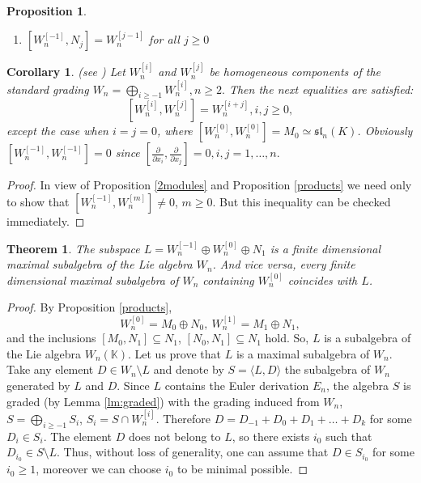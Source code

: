 \documentclass[12pt,a4paper]{amsart}
\theoremstyle{plain}
\newtheorem{theorem}{Theorem}
\newtheorem{proposition}{Proposition}
\newtheorem{corollary}{Corollary}
\theoremstyle{definition}
\begin{document}
{\begin{proposition}
\begin{enumerate}
			(b) $i= 0$, $j= 1,2,\dots$, where $[M_{0}, N_{j}] = N_{j}$,
			
			(c) $ i\geq 1 , j=0,  $ where $ [M_i, N_0]=M_i.$
			\item $[W_n^{[-1]}, N_{j}] = W_{n}^{[j-1]}$ for all $j\ge 0$
		\end{enumerate}
	\end{proposition}
	
	\begin{corollary}\label{W_iWj} (see \cite{CP25})
		Let  $W^{[i]}_n$ and $W^{[j]}_n$ be homogeneous components  of the standard grading $W_n= \underset{i\ge-1}{\bigoplus}W_{n}^{[i]}, n\geq 2.$ Then  the next equalities are satisfied: 
		$$[W^{[i]}_n, W^{[j]}_n]= W^{[i+j]}_n, i, j\geq 0,$$ except the case when  $i=j=0$, where $[W_{n}^{[0]}, W_{n}^{[0]}]=M_{0}\simeq \mathfrak{sl}_{n}(K)$. Obviously $[W_n^{[-1]}, W_n^{[-1]}]=0$ since $[\frac{\partial}{\partial x_i}, \frac{\partial}{\partial x_j}]=0, i,j=1,\ldots ,n. $
	\end{corollary}
	\begin{proof}
		In view of Proposition \ref{2modules} and Proposition \ref{products} we need only to show that 
		$[W_{n}^{[-1]}, W_{n}^{[m]}]\not = 0$, $m\ge 0$. But this inequality can be checked immediately. 
	\end{proof}
	\begin{theorem}\label{th5}
		The subspace $L = W_n^{[-1]} \oplus W_n^{[0]} \oplus N_1$  is a finite dimensional maximal subalgebra of the Lie algebra $W_n$. And vice versa, every finite dimensional maximal subalgebra of $W_n$ containing $W_n^{[0]}$ coincides with $L$.
	\end{theorem}
	\begin{proof}
		By Proposition  \ref{products}, 
		$$W_n^{[0]} = M_0 \oplus N_0,  \ W_n^{[1]} = M_1 \oplus N_1,$$ and the inclusions $[M_0, N_1] \subseteq N_1$, $[N_0, N_1] \subseteq N_1$ hold. So, $L$ is a subalgebra of the Lie algebra $W_n(\mathbb{K})$.
		Let us prove that $L$ is a maximal subalgebra of $W_n$. Take any element $D \in W_n \setminus L$ and denote by $S = \langle L, D \rangle$ the subalgebra of $W_n$ generated by $L$ and $D$. Since $L$ contains the Euler derivation $E_n$, the algebra $S$ is graded (by Lemma \ref{lm:graded}) with the grading induced from $W_n$, $S = \bigoplus_{i \ge -1} S_i$, $S_i = S \cap W_n^{[i]}$. Therefore $D = D_{-1} + D_0 + D_1 + \dots + D_k$ for some $D_i \in S_i$. The element $D$ does not belong to $L$, so there exists $i_0$ such that $D_{i_0} \in S \setminus L$. Thus, without loss of generality, one can assume that $D \in S_{i_0}$ for some $i_0 \ge 1$, moreover we can choose $i_0$ to be minimal possible.

\end{proof}}
\end{document}
